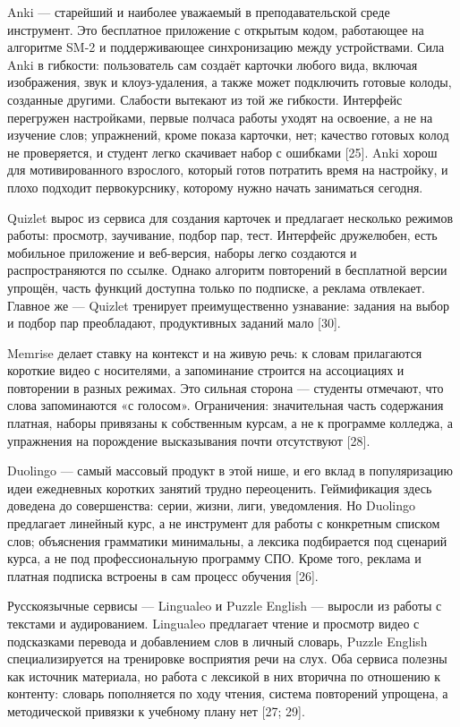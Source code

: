 \documentclass[11pt,a4paper,openany]{report}
\begin{document}
Anki — старейший и наиболее уважаемый в преподавательской среде инструмент. Это бесплатное приложение с открытым кодом, работающее на алгоритме SM-2 и поддерживающее синхронизацию между устройствами. Сила Anki в гибкости: пользователь сам создаёт карточки любого вида, включая изображения, звук и клоуз-удаления, а также может подключить готовые колоды, созданные другими. Слабости вытекают из той же гибкости. Интерфейс перегружен настройками, первые полчаса работы уходят на освоение, а не на изучение слов; упражнений, кроме показа карточки, нет; качество готовых колод не проверяется, и студент легко скачивает набор с ошибками [25]. Anki хорош для мотивированного взрослого, который готов потратить время на настройку, и плохо подходит первокурснику, которому нужно начать заниматься сегодня.

Quizlet вырос из сервиса для создания карточек и предлагает несколько режимов работы: просмотр, заучивание, подбор пар, тест. Интерфейс дружелюбен, есть мобильное приложение и веб-версия, наборы легко создаются и распространяются по ссылке. Однако алгоритм повторений в бесплатной версии упрощён, часть функций доступна только по подписке, а реклама отвлекает. Главное же — Quizlet тренирует преимущественно узнавание: задания на выбор и подбор пар преобладают, продуктивных заданий мало [30].

Memrise делает ставку на контекст и на живую речь: к словам прилагаются короткие видео с носителями, а запоминание строится на ассоциациях и повторении в разных режимах. Это сильная сторона — студенты отмечают, что слова запоминаются «с голосом». Ограничения: значительная часть содержания платная, наборы привязаны к собственным курсам, а не к программе колледжа, а упражнения на порождение высказывания почти отсутствуют [28].

Duolingo — самый массовый продукт в этой нише, и его вклад в популяризацию идеи ежедневных коротких занятий трудно переоценить. Геймификация здесь доведена до совершенства: серии, жизни, лиги, уведомления. Но Duolingo предлагает линейный курс, а не инструмент для работы с конкретным списком слов; объяснения грамматики минимальны, а лексика подбирается под сценарий курса, а не под профессиональную программу СПО. Кроме того, реклама и платная подписка встроены в сам процесс обучения [26].

Русскоязычные сервисы — Lingualeo и Puzzle English — выросли из работы с текстами и аудированием. Lingualeo предлагает чтение и просмотр видео с подсказками перевода и добавлением слов в личный словарь, Puzzle English специализируется на тренировке восприятия речи на слух. Оба сервиса полезны как источник материала, но работа с лексикой в них вторична по отношению к контенту: словарь пополняется по ходу чтения, система повторений упрощена, а методической привязки к учебному плану нет [27; 29].
\end{document}
